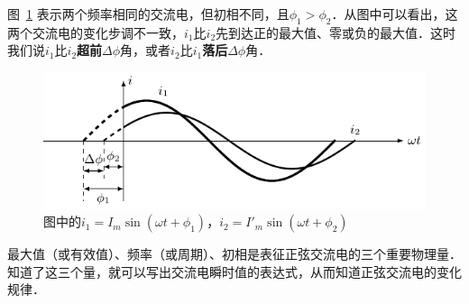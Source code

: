图~\ref{fig_C_3-8} 表示两个频率相同的交流电，但初相不同，且$\phi_1>\phi_2$．从图中可以看出，这两个交流电的变化步调不一致，$i_1$比$i_2$先到达正的最大值、零或负的最大值．这时我们说$i_1$比$i_2$\textbf{超前}$\Delta\phi$角，或者$i_2$比$i_1$\textbf{落后}$\Delta\phi$角．
\begin{figure}[htbp]
    \centering
    \includegraphics{fig/C/3-8.pdf}
    \caption{图中的$i_1=I_m\sin(\omega t+\phi_1)$，$i_2=I'_m\sin(\omega t+\phi_2)$}\label{fig_C_3-8}
\end{figure}

最大值（或有效值）、频率（或周期）、初相是表征正弦交流电的三个重要物理量．
知道了这三个量，就可以写出交流电瞬时值的表达式，从而知道正弦交流电的变化规律．

